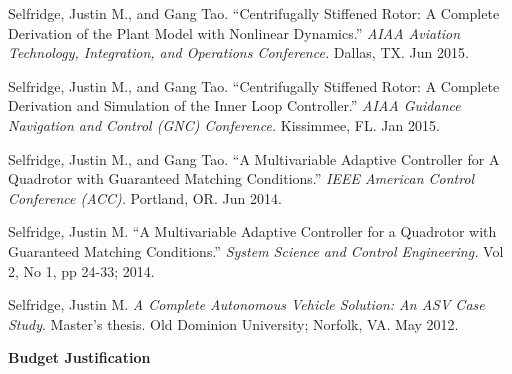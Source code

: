 \documentclass[11pt]{article}
\newcommand{\PubSpace}{\vspace{-0.12cm}}  %
\begin{document}
\PubSpace
Selfridge, Justin M., and Gang Tao.
``Centrifugally Stiffened Rotor: A Complete Derivation of the Plant Model with Nonlinear Dynamics.''
\emph{AIAA Aviation Technology, Integration, and Operations Conference.}
Dallas, TX.
Jun 2015.

\PubSpace
Selfridge, Justin M., and Gang Tao.
``Centrifugally Stiffened Rotor: A Complete Derivation and Simulation of the Inner Loop Controller.''
\emph{AIAA Guidance Navigation and Control (GNC) Conference.}
Kissimmee, FL.
Jan 2015.

\PubSpace
Selfridge, Justin M., and Gang Tao.
``A Multivariable Adaptive Controller for A Quadrotor with Guaranteed Matching Conditions.''
\emph{IEEE American Control Conference (ACC).}
Portland, OR.
Jun 2014.

\PubSpace
Selfridge, Justin M.
``A Multivariable Adaptive Controller for a Quadrotor with Guaranteed Matching Conditions.''
\emph{System Science and Control Engineering.}
Vol 2, No 1, pp 24-33; 2014.

\PubSpace
Selfridge, Justin M.
\emph{A Complete Autonomous Vehicle Solution: An ASV Case Study}.
Master's thesis.
Old Dominion University; Norfolk, VA.
May 2012.








\newpage
{\bf \Huge Budget Justification}
\end{document}
